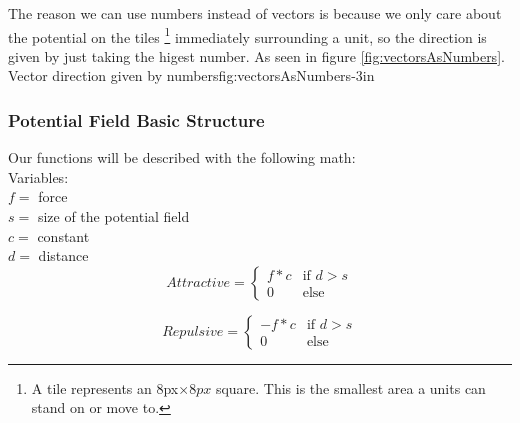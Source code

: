 		The reason we can use numbers instead of vectors is because we only care about the potential on the tiles \footnote{A tile represents an 8px$\times8px$ square. This is the smallest area a units can stand on or move to.} immediately surrounding a unit, so the direction is given by just taking the higest number. As seen in figure \ref{fig:vectorsAsNumbers}.
		{Vector direction given by numbers}{fig:vectorsAsNumbers}{-3in}
		\\
		
		\subsubsection{Potential Field Basic Structure}
		Our functions will be described with the following math\cite{ptlp}: \\
		
		Variables:\\
		$f =$ force\\
		$s =$ size of the potential field\\
		$c =$ constant\\
		$d =$ distance\\
		
		\begin{displaymath}
			Attractive = \begin{cases}
					f * c & \text{if $d > s$}\\
					0 & \text{else}
				\end{cases}		
		\end{displaymath}
			
		\begin{displaymath}
			Repulsive = \begin{cases}
					- f * c & \text{if $d > s$}\\
					0 & \text{else}
				\end{cases}		
		\end{displaymath}
		
		
